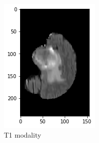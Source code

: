\begin{figure}[H]
\begin{subfigure}{.2\textwidth}
        \includegraphics[width=\linewidth]{chapters/04_segmentation/images/brats/3.png}
        \caption{T1 modality}
    \end{subfigure}%
        \begin{subfigure}{.2\textwidth}
        \centering

\end{subfigure}
\end{figure}
